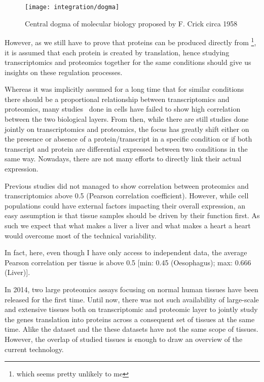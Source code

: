 \begin{figure}[!htbp]
    \texttt{[image: integration/dogma]}\centering
    \caption{\label{dogma}Central dogma of molecular biology proposed by F. Crick
    circa 1958}
\end{figure}

However, as we still have to prove that proteins can be produced directly
from \DNA\footnote{which seems pretty unlikely to me}, it is assumed that
each protein is created by translation, hence studying
transcriptomics and proteomics together for the same conditions should give us
insights on these regulation processes.

Whereas it was implicitly assumed for a long time that for similar conditions
there should be a proportional relationship between transcriptomics and
proteomics, many studies\
done in cells have failed to show high correlation between the two biological
layers. From then, while there are still studies done jointly on transcriptomics
and proteomics, the focus has greatly shift either on the presence or absence of
a protein/transcript in a specific condition or if both transcript and protein
are differential expressed between two conditions in the same way.
Nowadays, there are not many efforts to directly link their actual expression.

Previous studies did not managed to show correlation between proteomics and
transcriptomics above 0.5 (Pearson correlation coefficient).
However, while cell populations could have external factors impacting their
overall expression, an easy assumption is that tissue samples should be driven
by their function first. As such we expect that what makes a liver a liver and
what makes a heart a heart would overcome most of the technical variability.

In fact, here, even though I have only access to independent data, the average
Pearson correlation per tissue is above 0.5
[min: 0.45 (Oesophagus); max: 0.666 (Liver)].

In 2014, two large proteomics assays focusing on normal human tissues have been
released for the first time.
Until now, there was not such availability of large-scale and extensive tissues
both on transcriptomic and proteomic layer to jointly study the genes
translation into proteins across a consequent set of tissues
at the same time. Alike the  dataset and the 
these datasets have not the same scope of tissues. However, the overlap of
studied tissues is enough to draw an overview of the current technology.


